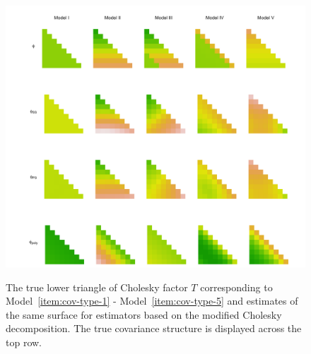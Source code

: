 
\begin{figure}[H] 
\centering
\caption{The true lower triangle of Cholesky factor $T$ corresponding to Model~\ref{item:cov-type-1} - Model~\ref{item:cov-type-5} and estimates of the same surface for estimators based on the modified Cholesky decomposition. The true covariance structure is displayed across the top row.}
  \includegraphics[width = 1\textwidth]{../img/chapter-4/cholesky-estimate-lattice}
  \label{fig:chol-estimate-lattice}
\end{figure}
